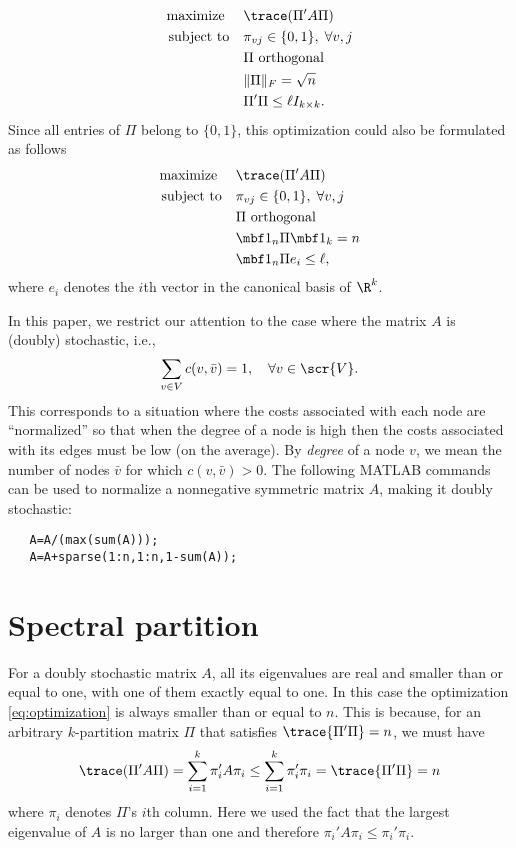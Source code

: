 \documentclass[10pt]{article}
\begin{document}
\begin{subequations}\label{eq:optimization}
\begin{align}
  \text{maximize }\quad    & \trace(\Pi'A \Pi)\\
  \text{subject to}\quad  & \pi_{v j}\in\{0,1\},\; \forall v,j\\
  &\Pi \text{ orthogonal}\\
  &\|\Pi\|_F=\sqrt n\\
  &\Pi'\Pi\leq \ell I_{k\times k}.
\end{align}
\end{subequations}
Since all entries of $\Pi$ belong to $\{0,1\}$, this optimization could
also be formulated as follows
\begin{subequations}
\begin{align*}
  \text{maximize }\quad    & \trace(\Pi'A \Pi)\\
  \text{subject to}\quad  & \pi_{v j}\in\{0,1\},\; \forall v,j\\
  &\Pi \text{ orthogonal}\\
  &\mbf 1_n \Pi\mbf 1_k=n\\
  &\mbf 1_n \Pi e_i\leq \ell,
\end{align*}
\end{subequations}
where $e_i$ denotes the $i$th vector in the canonical basis of $\R^k$.

\medskip

In this paper, we restrict our attention to the case where the matrix
$A$ is (doubly) stochastic, i.e.,
\begin{align*}
  \sum_{v\in V} c(v,\bar v)=1, \quad \forall v\in\scr{V}.
\end{align*}
This corresponds to a situation where the costs associated with each
node are ``normalized'' so that when the degree of a node is high then
the costs associated with its edges must be low (on the average). By
\emph{degree} of a node $v$, we mean the number of nodes $\bar v$ for
which $c(v,\bar v)>0$. The following MATLAB commands can be used to
normalize a nonnegative symmetric matrix $A$, making it doubly
stochastic:
\begin{verbatim}
   A=A/(max(sum(A)));
   A=A+sparse(1:n,1:n,1-sum(A));
\end{verbatim}


\section{Spectral partition}

For a doubly stochastic matrix $A$, all its eigenvalues are real and
smaller than or equal to one, with one of them exactly equal to one.
In this case the optimization \eqref{eq:optimization} is always
smaller than or equal to $n$. This is because, for an arbitrary
$k$-partition matrix $\Pi$ that satisfies $\trace{\Pi'\Pi}=n$, we must have
\begin{align}\label{eq:upper-n}
  \trace(\Pi'A\Pi)=\sum_{i=1}^k \pi_i' A\pi_i \leq \sum_{i=1}^k \pi_i' \pi_i =\trace{\Pi'\Pi}=n
\end{align}
where $\pi_i$ denotes $\Pi$'s $i$th column. Here we used the fact that the
largest eigenvalue of $A$ is no larger than one and therefore
$\pi_i' A\pi_i\leq \pi_i' \pi_i$.
\end{document}
